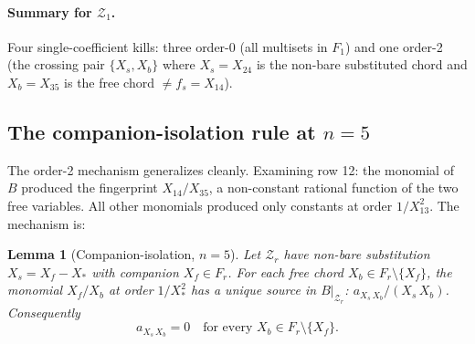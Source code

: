 \documentclass[11pt]{article}
\newcommand{\X}[2]{X_{#1#2}}
\newcommand{\Z}{\mathcal{Z}}
\newtheorem{lemma}{Lemma}
\theoremstyle{definition}
\begin{document}
\paragraph{Summary for $\Z_1$.} Four single-coefficient kills: three
order-0 (all multisets in $F_1$) and one order-2 (the crossing pair
$\{X_s, X_b\}$ where $X_s=\X{2}{4}$ is the non-bare substituted chord and
$X_b=\X{3}{5}$ is the free chord $\ne f_s = \X{1}{4}$).

\subsection{The companion-isolation rule at \texorpdfstring{$n=5$}{n=5}}

The order-2 mechanism generalizes cleanly. Examining row 12: the monomial
of $B$ produced the fingerprint $\X{1}{4}/\X{3}{5}$, a non-constant rational
function of the two free variables. All other monomials produced only
constants at order $1/\X{1}{3}^2$. The mechanism is:

\begin{lemma}[Companion-isolation, $n=5$]
\label{lem:companion-n5}
Let $\Z_r$ have non-bare substitution $X_s = X_f - X_*$ with companion
$X_f\in F_r$. For each free chord $X_b\in F_r\setminus\{X_f\}$, the monomial
$X_f/X_b$ at order $1/X_*^2$ has a unique source in $B|_{\Z_r}$:
$a_{X_s\,X_b}/(X_s\,X_b)$. Consequently
\[
a_{X_s\,X_b}=0\quad\text{for every }X_b\in F_r\setminus\{X_f\}.
\]
\end{lemma}
\end{document}
